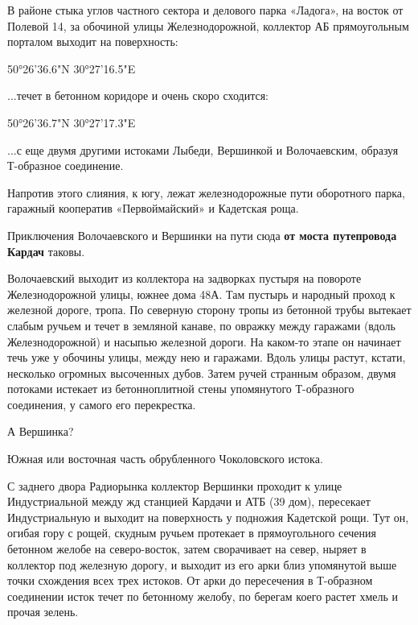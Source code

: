 В районе стыка углов частного сектора и делового парка «Ладога», на восток от Полевой 14, за обочиной улицы Железнодорожной, коллектор АБ прямоугольным порталом выходит на поверхность:

50°26'36.6"N 30°27'16.5"E

...течет в бетонном коридоре и очень скоро сходится:

50°26'36.7"N 30°27'17.3"E

...с еще двумя другими истоками Лыбеди, Вершинкой и Волочаевским, образуя Т-образное соединение. 

Напротив этого слияния, к югу, лежат железнодорожные пути оборотного парка, гаражный кооператив «Первоймайский» и Кадетская роща.

Приключения Волочаевского и Вершинки на пути сюда \textbf{от моста путепровода Кардач} таковы.

Волочаевский выходит из коллектора на задворках пустыря на повороте Железнодорожной улицы, южнее дома 48А. Там пустырь и народный проход к железной дороге, тропа. По северную сторону тропы из бетонной трубы вытекает слабым ручьем и течет в земляной канаве, по овражку между гаражами (вдоль Железнодорожной) и насыпью железной дороги. На каком-то этапе он начинает течь уже у обочины улицы, между нею и гаражами. Вдоль улицы растут, кстати, несколько огромных высоченных дубов. Затем ручей странным образом, двумя потоками истекает из бетонноплитной стены упомянутого Т-образного соединения, у самого его перекрестка.

А Вершинка?

Южная или восточная часть обрубленного Чоколовского истока. %

С заднего двора Радиорынка коллектор Вершинки проходит к улице Индустриальной между жд станцией Кардачи и АТБ (39 дом), пересекает Индустриальную и выходит на поверхность у подножия Кадетской рощи. Тут он, огибая гору с рощей, скудным ручьем протекает в прямоугольного сечения бетонном желобе на северо-восток, затем сворачивает на север, ныряет в коллектор под железную дорогу, и выходит из его арки близ упомянутой выше точки схождения всех трех истоков. От арки до пересечения в Т-образном соединении исток течет по бетонному желобу, по берегам коего растет хмель и прочая зелень.


